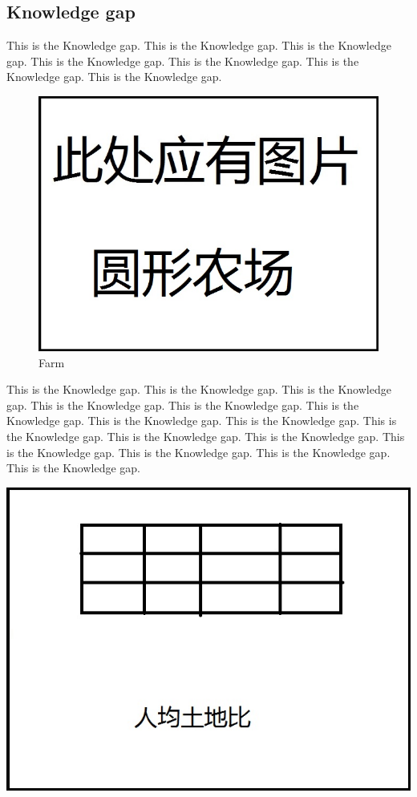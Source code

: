 \documentclass[12pt]{article}
\begin{document}
\begin{flushleft}
\subsection{Knowledge gap}
This is the Knowledge gap.  This is the Knowledge gap. This is the Knowledge gap. This is the Knowledge gap. This is the Knowledge gap. This is the Knowledge gap. This is the Knowledge gap. 
\begin{figure}[h!]
	\begin{center}
		\includegraphics[scale = 0.6]{farm.jpg}
		\caption{Farm}
	\end{center}
\end{figure}
This is the Knowledge gap. This is the Knowledge gap. This is the Knowledge gap. This is the Knowledge gap. This is the Knowledge gap. This is the Knowledge gap. This is the Knowledge gap. This is the Knowledge gap. This is the Knowledge gap. \cite{egbelu1986potentials}This is the Knowledge gap. This is the Knowledge gap. This is the Knowledge gap. This is the Knowledge gap. This is the Knowledge gap. This is the Knowledge gap. 
\begin{table}[h!]
	\begin{center}
		\includegraphics[scale = 0.6]{landratio.jpg}

\end{center}
\end{table}
\end{flushleft}
\end{document}

